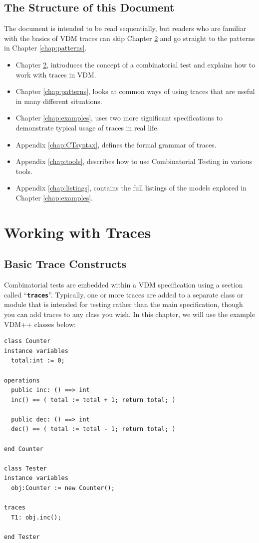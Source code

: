 \documentclass{overturerepchap}
\begin{document}
\section{The Structure of this Document}

The document is intended to be read sequentially, but readers who are familiar
with the basics of VDM traces can skip Chapter \ref{chap:traces} and go straight
to the patterns in Chapter \ref{chap:patterns}.

\begin{itemize}
\item Chapter \ref{chap:traces},  introduces the concept of
a combinatorial test and explains how to work with traces in VDM.
\item Chapter \ref{chap:patterns},  looks at common ways
of using traces that are useful in many different situations.
\item Chapter \ref{chap:examples},  uses two more
significant specifications to demonstrate typical usage of traces in real life.
\item Appendix \ref{chap:CTsyntax},  defines the formal
grammar of traces.
\item Appendix \ref{chap:tools},  describes how to use
Combinatorial Testing in various tools.
\item Appendix \ref{chap:listings},  contains the full
listings of the models explored in Chapter \ref{chap:examples}.
\end{itemize}

\chapter{Working with Traces}
\label{chap:traces}

\section{Basic Trace Constructs}
Combinatorial tests are embedded within a VDM specification using a section
called ``\texttt{\textbf{traces}}''. Typically, one or more traces are added to a separate class
or module that is intended for testing rather than the main specification,
though you can add traces to any class you wish. In this chapter, we will use
the example VDM++ classes below:

\small
\begin{lstlisting}
class Counter
instance variables
  total:int := 0;

operations
  public inc: () ==> int
  inc() == ( total := total + 1; return total; )

  public dec: () ==> int
  dec() == ( total := total - 1; return total; )

end Counter

class Tester
instance variables
  obj:Counter := new Counter();

traces
  T1: obj.inc();

end Tester
\end{lstlisting}
\normalsize
\end{document}
